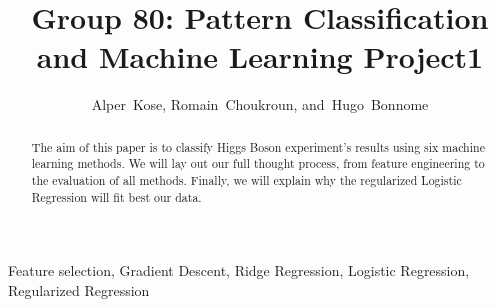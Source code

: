 \documentclass[journal]{IEEEtran}
\begin{document}
%
\title{Group 80: Pattern Classification and Machine Learning Project1}


\author{Alper~Kose,
        Romain~Choukroun,
        and~Hugo~Bonnome
}


\maketitle


\begin{abstract}

The aim of this paper is to classify Higgs Boson experiment's results using six machine learning methods. We will lay out our full thought process, from feature engineering to the evaluation of all methods. Finally, we will explain why the regularized Logistic Regression will fit best our data.



\end{abstract}

\begin{IEEEkeywords}
Feature selection, Gradient Descent, Ridge Regression, Logistic Regression, Regularized Regression
\end{IEEEkeywords}


%
\IEEEpeerreviewmaketitle
\end{document}
